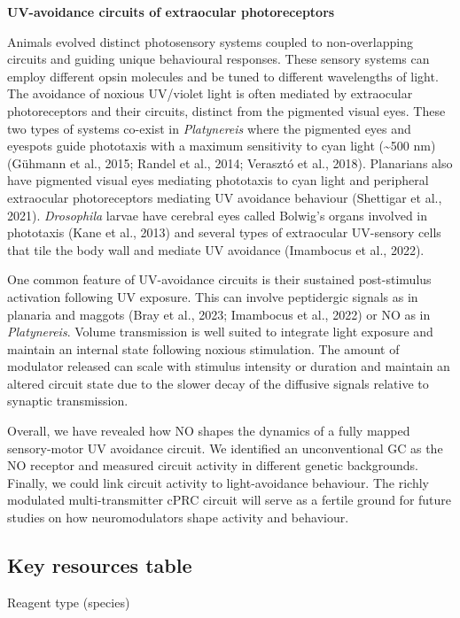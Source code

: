 \documentclass[
  10pt,
  onecolumn]{article}
\begin{document}
\textbf{UV-avoidance circuits of extraocular photoreceptors}

Animals evolved distinct photosensory systems coupled to non-overlapping
circuits and guiding unique behavioural responses. These sensory systems
can employ different opsin molecules and be tuned to different
wavelengths of light. The avoidance of noxious UV/violet light is often
mediated by extraocular photoreceptors and their circuits, distinct from
the pigmented visual eyes. These two types of systems co-exist in
\emph{Platynereis} where the pigmented eyes and eyespots guide
phototaxis with a maximum sensitivity to cyan light (\textasciitilde500
nm) (Gühmann et al., 2015; Randel et al., 2014; Verasztó et al., 2018).
Planarians also have pigmented visual eyes mediating phototaxis to cyan
light and peripheral extraocular photoreceptors mediating UV avoidance
behaviour (Shettigar et al., 2021). \emph{Drosophila} larvae have
cerebral eyes called Bolwig's organs involved in phototaxis (Kane et
al., 2013) and several types of extraocular UV-sensory cells that tile
the body wall and mediate UV avoidance (Imambocus et al., 2022).

One common feature of UV-avoidance circuits is their sustained
post-stimulus activation following UV exposure. This can involve
peptidergic signals as in planaria and maggots (Bray et al., 2023;
Imambocus et al., 2022) or NO as in \emph{Platynereis}. Volume
transmission is well suited to integrate light exposure and maintain an
internal state following noxious stimulation. The amount of modulator
released can scale with stimulus intensity or duration and maintain an
altered circuit state due to the slower decay of the diffusive signals
relative to synaptic transmission.

Overall, we have revealed how NO shapes the dynamics of a fully mapped
sensory-motor UV avoidance circuit. We identified an unconventional GC
as the NO receptor and measured circuit activity in different genetic
backgrounds. Finally, we could link circuit activity to light-avoidance
behaviour. The richly modulated multi-transmitter cPRC circuit will
serve as a fertile ground for future studies on how neuromodulators
shape activity and behaviour.

\hypertarget{key-resources-table}{%
\subsection{Key resources table}\label{key-resources-table}}

Reagent type (species)
\end{document}
